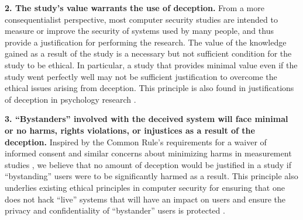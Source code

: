\textbf{2. The study's value warrants the use of deception.}
From a more consequentialist perspective, most computer security studies are intended to measure or improve the security of systems used by many people, and thus provide a justification for performing the research.  The value of the knowledge gained as a result of the study is a necessary but not sufficient condition for the study to be ethical.  In particular, a study that provides minimal value even if the study went perfectly well may not be sufficient justification to overcome the ethical issues arising from deception.  This principle is also found in justifications of deception in psychology research \cite{christensenDeceptionPsychologicalResearch1988,goodeEthicsDeceptionSocial1996,findleyObligatedDeceiveAliases2016}.

\textbf{3. ``Bystanders'' involved with the deceived system will face minimal or no harms, rights violations, or injustices as a result of the deception.}
Inspired by the Common Rule's requirements for a waiver of informed consent \cite{InformedConsentFAQs} and similar concerns about minimizing harms in measurement studies \cite{partridgeEthicalConsiderationsNetwork2016}, we believe that no amount of deception would be justified in a study if ``bystanding'' users were to be significantly harmed as a result.
This principle also underlies existing ethical principles in computer security for ensuring that one does not hack ``live'' systems that will have an impact on users \cite{kohnoEthicalFrameworksComputer} and ensure the privacy and confidentiality of ``bystander'' users is protected \cite{menloReport,alllmanIssuesEtiquetteConcerning2007,cranorConferenceSubmissionReview}.


